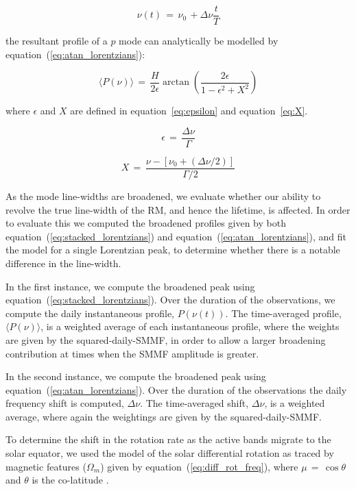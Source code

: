 \begin{equation}
\nu(t) \, = \, \nu_0 \, +  \Delta\nu \frac{t}{T}
\label{eq:linear_variation}
\end{equation}

the resultant profile of a $p$ mode can analytically be modelled by equation~(\ref{eq:atan_lorentzians}):

\begin{equation}
\langle P(\nu) \rangle \, = \, \frac{H}{2\epsilon} \arctan \left( \frac{2 \epsilon}{1 - \epsilon^2 + X^2 } \right)
\label{eq:atan_lorentzians}
\end{equation}

where $\epsilon$ and $X$ are defined in equation~\ref{eq:epsilon} and equation~\ref{eq:X}.

\begin{equation}
\epsilon \, = \, \frac{\Delta\nu}{\Gamma}
\label{eq:epsilon}
\end{equation}

\begin{equation}
X \, = \, \frac{\nu - [\nu_0 + (\Delta\nu/2)]}{\Gamma /2}
\label{eq:X}
\end{equation}

As the mode line-widths are broadened, we evaluate whether our ability to revolve the true line-width of the RM, and hence the lifetime, is affected. In order to evaluate this we computed the broadened profiles given by both equation~(\ref{eq:stacked_lorentzians}) and equation~(\ref{eq:atan_lorentzians}), and fit the model for a single Lorentzian peak, to determine whether there is a notable difference in the line-width.

In the first instance, we compute the broadened peak using equation~(\ref{eq:stacked_lorentzians}). Over the duration of the observations, we compute the daily instantaneous profile, $P(\nu(t))$. The time-averaged profile, $ 
\langle P(\nu) \rangle$, is a weighted average of each instantaneous profile, where the weights are given by the squared-daily-SMMF, in order to allow a larger broadening contribution at times when the SMMF amplitude is greater.

In the second instance, we compute the broadened peak using equation~(\ref{eq:atan_lorentzians}). Over the duration of the observations the daily frequency shift is computed, $\Delta\nu$. The time-averaged shift, $\Delta\nu$, is a weighted average, where again the weightings are given by the squared-daily-SMMF.

To determine the shift in the rotation rate as the active bands migrate to the solar equator, we used the model of the solar differential rotation as traced by magnetic features ($\Omega_m$) given by equation~(\ref{eq:diff_rot_freq}), where $\mu \, = \, \cos \theta $ and $\theta$ is the co-latitude \citep{snodgrass_magnetic_1983, brown_inferring_1989}.

